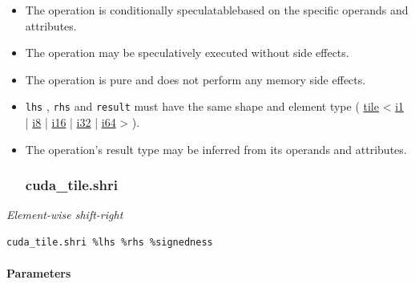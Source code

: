 \documentclass{article}
\begin{document}
\begin{itemize}
\item The operation is conditionally speculatablebased on the specific operands and attributes.
\item The operation may be speculatively executed without side effects.
\item The operation is pure and does not perform any memory side effects.
\item \texttt{lhs} , \texttt{rhs} and \texttt{result} must have the same shape and element type ( \href{https://docs.nvidia.com/cuda/tile-ir/latest/sections/types.html#type-tile}{tile} < \href{https://docs.nvidia.com/cuda/tile-ir/latest/sections/types.html#subsection-element-types}{i1} | \href{https://docs.nvidia.com/cuda/tile-ir/latest/sections/types.html#subsection-element-types}{i8} | \href{https://docs.nvidia.com/cuda/tile-ir/latest/sections/types.html#subsection-element-types}{i16} | \href{https://docs.nvidia.com/cuda/tile-ir/latest/sections/types.html#subsection-element-types}{i32} | \href{https://docs.nvidia.com/cuda/tile-ir/latest/sections/types.html#subsection-element-types}{i64} > ).
\item The operation's result type may be inferred from its operands and attributes.


\subsubsection{cuda\_tile.shri}

\end{itemize}
\textit{Element-wise shift-right}


\begin{lstlisting}
cuda_tile.shri %lhs %rhs %signedness
\end{lstlisting}

\paragraph{Parameters}
\end{document}
